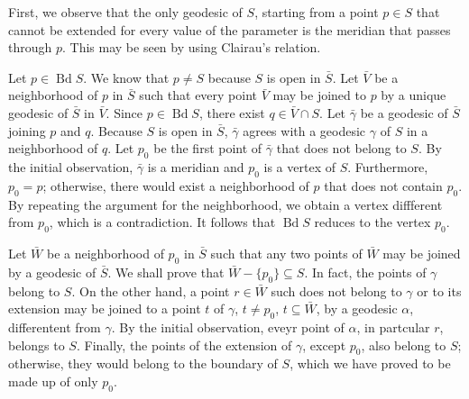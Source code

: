 \documentclass[10pt]{article}
\newcommand{\sseq}{\subseteq}
\DeclareMathOperator{\Bd}{Bd}
\begin{document}
\begin{itemize}
    First, we observe that the only geodesic of $S$, starting from a point $p \in S$ that cannot be extended for every value of the parameter is the meridian that passes through $p$. This may be seen by using Clairau's relation.

    Let $p \in \Bd S$. We know that $p \neq S$ because $S$ is open in $\bar S$. Let $\bar V$ be a neighborhood of $p$ in $\bar S$ such that every point $\bar V$ may be joined to $p$ by a unique geodesic of $\bar S$ in $\bar V$. Since $p \in \Bd S$, there exist $q \in\bar V \cap S$. Let $\bar \gamma$ be a geodesic of $\bar S$ joining $p$ and $q$. Because $S$ is open in $\bar S$, $\bar \gamma$ agrees with a geodesic $\gamma$ of $S$ in a neighborhood of $q$. Let $p_0$ be the first point of $\bar \gamma$ that does not belong to $S$. By the initial observation, $\bar \gamma$ is a meridian and $p_0$ is a vertex of $S$. Furthermore, $p_0 = p$; otherwise, there would exist a neighborhood of $p$ that does not contain $p_0$. By repeating the argument for the neighborhood, we obtain a vertex diffferent from $p_0$, which is a contradiction. It follows that $\Bd S$ reduces to the vertex $p_0$.

    Let $\bar W$ be a neighborhood of $p_0$ in $\bar S$ such that any two points of $\bar W$ may be joined by a geodesic of $\bar S$. We shall prove that $\bar W - \{ p_0 \} \sseq S$. In fact, the points of $\gamma$ belong to $S$. On the other hand, a point $r \in \bar W$ such does not belong to $\gamma$ or to its extension may be joined to a point $t$ of $\gamma$, $t \neq p_0$, $t \sseq \bar W$, by a geodesic $\alpha$, differentent from $\gamma$. By the initial observation, eveyr point of $\alpha$, in partcular $r$, belongs to $S$. Finally, the points of the extension of $\gamma$, except $p_0$, also belong to $S$; otherwise, they would belong to the boundary of $S$, which we have proved to be made up of only $p_0$.
  \end{itemize}
\end{document}
